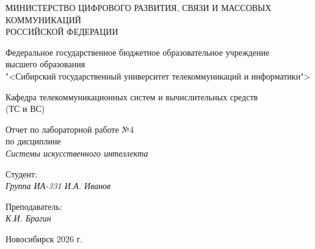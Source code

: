 \thispagestyle{empty}

\begin{center}
    МИНИСТЕРСТВО ЦИФРОВОГО РАЗВИТИЯ, СВЯЗИ И МАССОВЫХ КОММУНИКАЦИЙ \\ РОССИЙСКОЙ ФЕДЕРАЦИИ
    
    \vspace{20pt}
    
    Федеральное государственное бюджетное образовательное учреждение  \\  высшего образования \\
    "<Сибирский государственный университет телекоммуникаций и информатики"> \\
    
    \vspace{20pt}
    
    Кафедра телекоммуникационных систем и вычислительных средств \\  (ТС и ВС)
\end{center}

\vfill

\begin{center}
    Отчет по лабораторной работе №4  \\  
    по дисциплине \\
    \textit{Системы искусственного интеллекта}
    \vspace{20pt}
\end{center}

\vfill

    \noindent Студент: \\
    \textit{Группа ИА-331 \hfill И.А. Иванов}
    
    \vspace{20pt}

    \vspace{20pt}
    
    \noindent Преподаватель: \\
    \textit{\hfill К.И. Брагин}
    
\vfill

\begin{center}
    Новосибирск 2026 г.
\end{center}